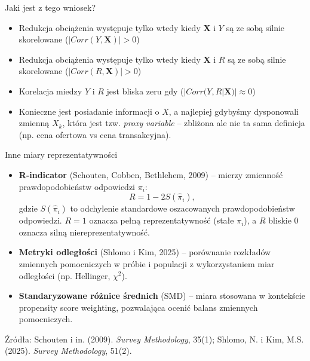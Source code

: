 \documentclass[10pt,ignorenonframetext, aspectratio=169]{beamer}
\newcommand{\bX}{\boldsymbol{X}}
\begin{document}
\begin{frame}{Jaki jest z tego wniosek?}
    \begin{itemize}
        \item Redukcja obciążenia występuje tylko wtedy kiedy $\bX$ i $Y$ są ze sobą silnie skorelowane ($|Corr(Y,\bX)| > 0$)
        \item Redukcja obciążenia występuje tylko wtedy kiedy $\bX$ i $R$ są ze sobą silnie skorelowane  ($|Corr(R,\bX)| > 0$)
        \item Korelacja miedzy $Y$ i $R$ jest bliska zeru gdy  ($|Corr(Y,R| \bX)| \approx 0$)
        \item Konieczne jest posiadanie informacji o $X$, a najlepiej gdybyśmy dysponowali zmienną $X_k$, która jest tzw. \textit{proxy variable} -- zbliżona ale nie ta sama definicja  (np. cena ofertowa vs cena transakcyjna).
    \end{itemize}
\end{frame}

\begin{frame}{Inne miary reprezentatywności}

\begin{itemize}
    \justifying
    \item \textbf{R-indicator} (Schouten, Cobben, Bethlehem, 2009) -- mierzy zmienność prawdopodobieństw odpowiedzi $\pi_i$:
    \begin{equation}
        R = 1 - 2 S(\hat{\pi}_i),
    \end{equation}
    gdzie $S(\hat{\pi}_i)$ to odchylenie standardowe oszacowanych prawdopodobieństw odpowiedzi. $R = 1$ oznacza pełną reprezentatywność (stałe $\pi_i$), a $R$ bliskie 0 oznacza silną niereprezentatywność.

    \item \textbf{Metryki odległości} (Shlomo i Kim, 2025) -- porównanie rozkładów zmiennych pomocniczych w próbie i populacji z wykorzystaniem miar odległości (np. Hellinger, $\chi^2$).

    \item \textbf{Standaryzowane różnice średnich} (SMD) -- miara stosowana w kontekście propensity score weighting, pozwalająca ocenić balans zmiennych pomocniczych.
\end{itemize}

\vspace{0.3cm}
\small{Źródła: Schouten i in. (2009). \textit{Survey Methodology}, 35(1); Shlomo, N. i Kim, M.S. (2025). \textit{Survey Methodology}, 51(2).}
\end{frame}
\end{document}
